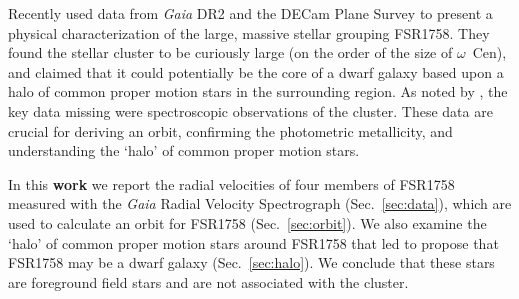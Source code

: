 \documentclass[fleqn,usenatbib]{mnras}
\begin{document}
Recently \citet[][hereafter ]{Barba2018} used data from \textit{Gaia} DR2 and the DECam Plane Survey \citep[DECaPS;][]{Schlafly2018} to present a physical characterization of the large, massive stellar grouping FSR1758. They found the stellar cluster to be curiously large (on the order of the size of $\omega$~Cen), and claimed that it could potentially be the core of a dwarf galaxy based upon a halo of common proper motion stars in the surrounding region. As noted by , the key data missing were spectroscopic observations of the cluster. These data are crucial for deriving an orbit, confirming the photometric metallicity, and understanding the `halo' of common proper motion stars.

In this \textbf{work} we report the radial velocities of four members of FSR1758 measured with the \textit{Gaia} Radial Velocity Spectrograph \citep[RVS;][]{Cropper2018,GaiaCollaboration:2018fx} (Sec.\ \ref{sec:data}), which are used to calculate an orbit for FSR1758 (Sec.\ \ref{sec:orbit}). We also examine the `halo' of common proper motion stars around FSR1758 that led  to propose that FSR1758 may be a dwarf galaxy (Sec.\  \ref{sec:halo}). We conclude that these stars are foreground field stars and are not associated with the cluster.
\end{document}
